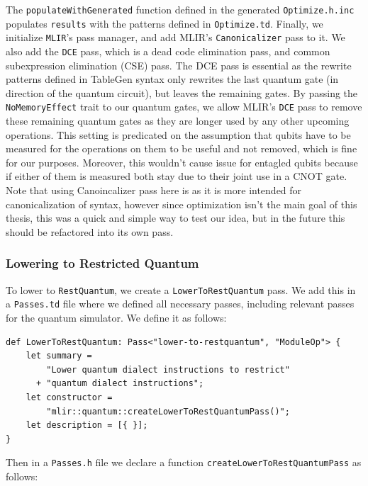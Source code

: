 The \texttt{populateWithGenerated}  function defined in the generated
\texttt{Optimize.h.inc} populates \texttt{results} with the patterns defined in
\texttt{Optimize.td}. Finally, we initialize \texttt{MLIR}'s pass manager, and
add MLIR's \texttt{Canonicalizer} pass to it. We also add the \texttt{DCE} pass,
which is a dead code elimination pass, and common subexpression elimination (CSE)
pass.
The DCE pass is essential as the rewrite patterns
defined in TableGen syntax only rewrites the last quantum gate (in direction of
the quantum circuit), but leaves the remaining gates. By passing the
\texttt{NoMemoryEffect} trait to our quantum gates, we allow MLIR's \texttt{DCE}
pass to remove these remaining quantum gates as they are longer used by any
other upcoming operations. This setting is predicated on the assumption that
qubits have to be measured for the operations on them to be useful and not
removed, which is fine for our purposes. Moreover, this wouldn't cause issue for
entagled qubits because if either of them is measured both stay due to their
joint use in a CNOT gate. Note that using Canoincalizer pass here is  as it is
more intended for canonicalization of syntax, however since optimization isn't
the main goal of this thesis, this was a quick and simple way to test our idea,
but in the future this should be refactored into its own pass.


\subsubsection{Lowering to Restricted Quantum}
To lower to \texttt{RestQuantum}, we create a  \texttt{LowerToRestQuantum} pass.
We add this in a \texttt{Passes.td} file where we defined all necessary passes,
including relevant passes for the quantum simulator. We define it as follows:
\begin{verbatim}
def LowerToRestQuantum: Pass<"lower-to-restquantum", "ModuleOp"> { 
    let summary =
        "Lower quantum dialect instructions to restrict" 
      + "quantum dialect instructions"; 
    let constructor =
        "mlir::quantum::createLowerToRestQuantumPass()"; 
    let description = [{ }];
}
\end{verbatim}

Then in a \texttt{Passes.h} file we declare a function
\texttt{createLowerToRestQuantumPass} as follows:

